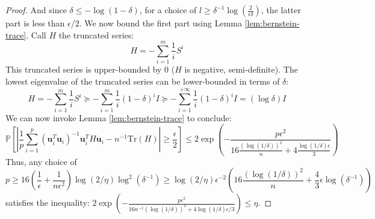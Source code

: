 \begin{proof}
And since $\delta\le-\log\left(1-\delta\right)$, for a choice of
$l\geq\delta^{-1}\log\left(\frac{2}{\epsilon\delta}\right)$, the
latter part is less than $\epsilon/2$. We now bound the first part
using Lemma \ref{lem:bernstein-trace}. Call $H$ the truncated series:
\[
H=-\sum_{i=1}^{m}\frac{1}{i}S^{i}
\]
This truncated series is upper-bounded by $0$ ($H$ is negative,
semi-definite). The lowest eigenvalue of the truncated series can
be lower-bounded in terms of $\delta$: 
\[
H=-\sum_{i=1}^{m}\frac{1}{i}S^{i}\succeq-\sum_{i=1}^{m}\frac{1}{i}\left(1-\delta\right)^{i}I\succeq-\sum_{i=1}^{+\infty}\frac{1}{i}\left(1-\delta\right)^{i}I=\left(\log\delta\right)I
\]
We can now invoke Lemma \ref{lem:bernstein-trace} to conclude: 
\[
\mathbb{P}\left[\left|\frac{1}{p}\sum_{i=1}^{p}\left(\mathbf{u}_{i}^{T}\mathbf{u}_{i}\right)^{-1}\mathbf{u}_{i}^{T}H\mathbf{u}_{i}-n^{-1}\mbox{Tr}\left(H\right)\right|\geq\frac{\epsilon}{2}\right]\leq2\exp\left(-\frac{p\epsilon^{2}}{16\frac{\left(\log\left(1/\delta\right)\right)^{2}}{n}+4\frac{\log\left(1/\delta\right)\epsilon}{3}}\right)
\]
Thus, any choice of 
\[
p\geq16\left(\frac{1}{\epsilon}+\frac{1}{n\epsilon^{2}}\right)\log\left(2/\eta\right)\log^{2}\left(\delta^{-1}\right)\geq\log\left(2/\eta\right)\epsilon^{-2}\left(16\frac{\left(\log\left(1/\delta\right)\right)^{2}}{n}+\frac{4}{3}\epsilon\log\left(\delta^{-1}\right)\right)
\]
satisfies the inequality: $2\exp\left(-\frac{p\epsilon^{2}}{16n^{-1}\left(\log\left(1/\delta\right)\right)^{2}+4\log\left(1/\delta\right)\epsilon/3}\right)\leq\eta$. 
\end{proof}

